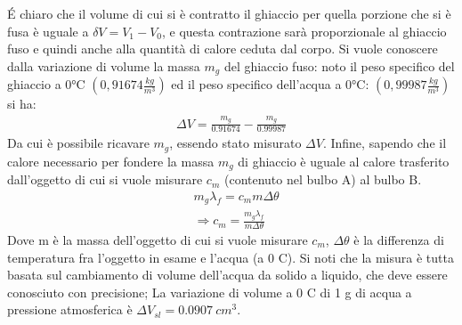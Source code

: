 \documentclass[
10pt, %
a4paper, %
oneside, %
headinclude,footinclude, %
BCOR5mm, %
]{scrartcl}
\begin{document}
\'{E} chiaro che il volume di cui si è contratto il ghiaccio per quella porzione che si è fusa è uguale a $\delta V = V_1-V_0$, e questa contrazione sarà proporzionale al ghiaccio fuso e quindi anche alla quantità di calore ceduta dal corpo. Si vuole conoscere dalla variazione di volume la massa $m_g$ del ghiaccio fuso: noto il peso specifico del ghiaccio a 0°C \((0,91674 \frac{kg}{m^3})\) ed il peso specifico dell’acqua a 0°C: \((0,99987 \frac{kg}{m^3})\) si ha:
\begin{align*} 
	\Delta V = \frac{m_g}{0.91674}-\frac{m_g}{0.99987}
\end{align*} 
Da cui è possibile ricavare $m_g$, essendo stato misurato $\Delta V$. Infine, sapendo che il calore necessario per fondere la massa $m_g$ di ghiaccio è uguale al calore trasferito dall'oggetto di cui si vuole misurare $c_m$ (contenuto nel bulbo A) al bulbo B.
\begin{align*} 
	&m_g \lambda_f = c_m m \Delta\theta\\
	&\Rightarrow c_m = \frac{m_g \lambda_f}{m \Delta \theta}
\end{align*} 
Dove m è la massa dell'oggetto di cui si vuole misurare $c_m$, $\Delta \theta$ è la differenza di temperatura fra l'oggetto in esame e l'acqua (a 0 \textdegree C). Si noti che la misura è tutta basata sul cambiamento di volume dell'acqua da solido a liquido, che deve essere conosciuto con precisione; La variazione di volume a 0 \textdegree C di 1 g di acqua a pressione atmosferica è  $\Delta V_{sl} = 0.0907\ cm^3$.
\end{document}
